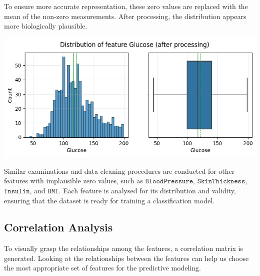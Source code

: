 \documentclass[12pt]{article}
\begin{document}
\vspace{-6pt}

To ensure more accurate representation, these zero values are replaced with the mean of the non-zero measurements.
After processing, the distribution appears more biologically plausible.


\begin{center}
    \includegraphics[width=0.7\linewidth]{images/dist - glucose - after processing.png}
    
    \vspace{-8pt}
    
    
    \label{fig:dist-glucose-after}
\end{center}


Similar examinations and data cleaning procedures are conducted for other features with implausible zero values, such as $\mathtt{BloodPressure}$, $\mathtt{SkinThickness}$, $\mathtt{Insulin}$, and $\mathtt{BMI}$. Each feature is analysed for its distribution and validity, ensuring that the dataset is ready for training a classification model.


\subsection{Correlation Analysis}

\indent To visually grasp the relationships among the features, a correlation matrix is generated. Looking at the relationships between the features can help us choose the most appropriate set of features for the predictive modeling.

\vspace{-15pt}
\end{document}
